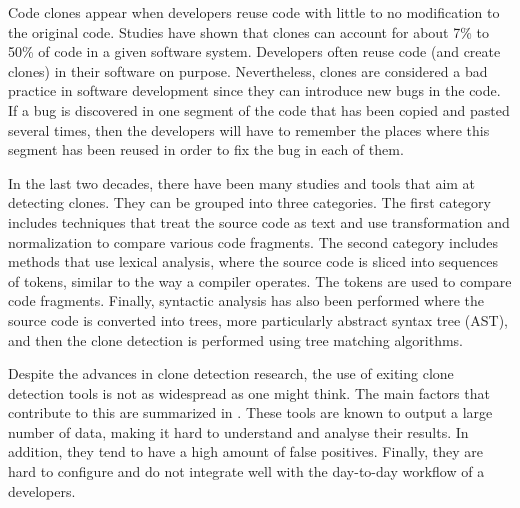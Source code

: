 \documentclass[conference]{IEEEtran}
\begin{document}
Code clones appear when developers reuse code with little to no modification to the original code.
Studies have shown  that clones can account for about 7\% to 50\% of code in a given software system\cite{Baker, StephaneDucasse}.
Developers often reuse code (and create clones) in their software on purpose\cite{Kim2005}.
Nevertheless, clones are considered a bad practice in software development since they can introduce new bugs in the code\cite{Kapser2006,Juergens2009,Li2006}.
If a  bug is discovered in one segment of the code that has been copied and pasted several times, then the developers will have to remember the places where this segment has been reused in order to fix the bug in each of them.

In the last two decades, there have been many studies and tools that aim at detecting clones. They can be grouped into three categories.
The first category includes techniques that treat the source code as text and use transformation and normalization  to compare various code fragments\cite{Johnson1994,Johnson1993, Cordy2011, Roy2008}.
The second category includes methods that
use lexical analysis, where the source code is sliced into sequences of tokens, similar to the way a compiler operates\cite{Baker,Bakera,Baker2002,Kamiya2002,Li2006}.
The tokens are used to compare code fragments.
Finally, syntactic analysis has also been performed where the source code is converted into trees, more particularly abstract syntax tree (AST), and then the clone detection is performed using tree matching algorithms\cite{Baxter1998, Komondoor2000, Tairas2006, Falke2008}.

Despite the advances in clone detection research, the use of exiting clone detection tools is not as widespread as one might think.
The main factors that contribute to this are summarized in \cite{Johnson2013}. These tools are known to output a large number of data, making it hard to understand and analyse their results. In addition, they tend to have a high amount of false positives. Finally, they are hard to configure and do not integrate well with the day-to-day workflow of a developers.
\end{document}
